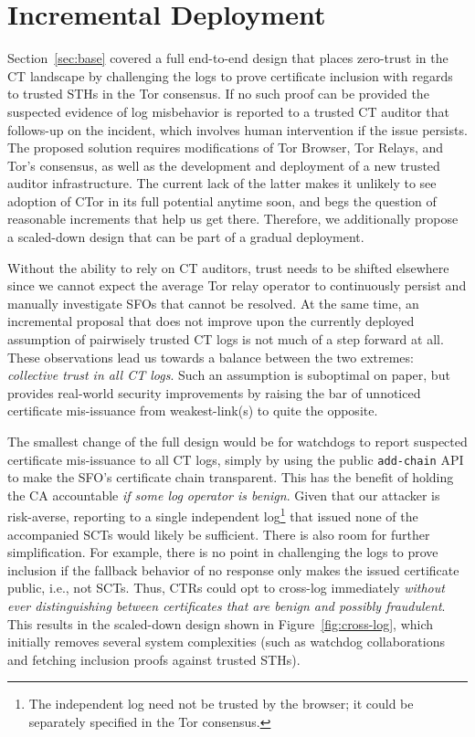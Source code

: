 \section{Incremental Deployment} \label{sec:incremental}
Section~\ref{sec:base} covered a full end-to-end design that places zero-trust
in the CT landscape by challenging the logs to prove certificate inclusion with
regards to trusted STHs in the Tor consensus.  If no such proof can be provided
the suspected evidence of log misbehavior is reported to a trusted CT auditor
that follows-up on the incident, which involves human intervention if the issue
persists.  The proposed solution requires modifications of Tor Browser, Tor
Relays, and Tor's consensus, as well as the development and deployment of a new trusted auditor
infrastructure.  The current lack of the latter makes it unlikely to see
adoption of CTor in its full potential anytime soon, and begs the question of
reasonable increments that help us get there.  Therefore, we additionally
propose a scaled-down design that can be part of a gradual deployment.

Without the ability to rely on CT auditors, trust needs to be shifted elsewhere
since we cannot expect the average Tor relay operator to continuously persist
and manually investigate SFOs that cannot be resolved.  At the same time, an
incremental proposal that does not improve upon the currently deployed assumption of pairwisely trusted
CT logs is not much of a step forward at all.  These observations lead us
towards a balance between the two extremes:
	\emph{collective trust in all CT logs}.
Such an assumption is suboptimal on paper, but provides real-world security
improvements by raising the bar of unnoticed certificate mis-issuance from
weakest-link(s) to quite the opposite.

The smallest change of the full design would be for watchdogs to report
suspected certificate mis-issuance to all CT logs, simply by using the public
\texttt{add-chain} API to make the SFO's certificate chain transparent.  This
has the benefit of holding the CA accountable \emph{if some log operator is
benign}.  Given that our attacker is risk-averse, reporting to a single
independent log\footnote{The independent log need not be trusted by the browser; it could be separately specified in the Tor consensus.} that issued none of the accompanied SCTs would likely be
sufficient.  There is also room for further simplification.  For example, there
is no point in challenging the logs to prove inclusion if the fallback behavior
of no response only makes the issued certificate public, i.e., not SCTs.
Thus, CTRs could opt to cross-log immediately \emph{without ever distinguishing
between certificates that are benign and possibly fraudulent}.  This results in
the scaled-down design shown in Figure~\ref{fig:cross-log}, which initially
removes several system complexities (such as watchdog collaborations and
fetching inclusion proofs against trusted STHs).

